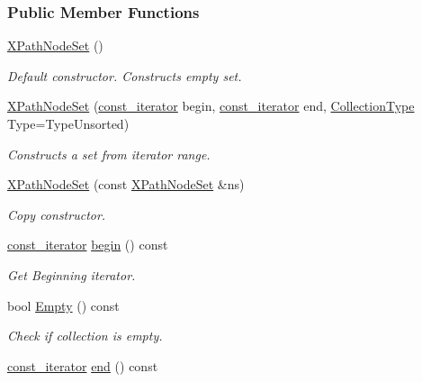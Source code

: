\subsubsection*{Public Member Functions}
\begin{DoxyCompactItemize}
\item 
\hypertarget{classMezzanine_1_1xml_1_1XPathNodeSet_ab608150b1aeff0937670c2f4b254e19d}{
\hyperlink{classMezzanine_1_1xml_1_1XPathNodeSet_ab608150b1aeff0937670c2f4b254e19d}{XPathNodeSet} ()}
\label{classMezzanine_1_1xml_1_1XPathNodeSet_ab608150b1aeff0937670c2f4b254e19d}

\begin{DoxyCompactList}\small\item\em Default constructor. Constructs empty set. \item\end{DoxyCompactList}\item 
\hyperlink{classMezzanine_1_1xml_1_1XPathNodeSet_a0346d486509ba8948918c623f6c697f5}{XPathNodeSet} (\hyperlink{classMezzanine_1_1xml_1_1XPathNode}{const\_\-iterator} begin, \hyperlink{classMezzanine_1_1xml_1_1XPathNode}{const\_\-iterator} end, \hyperlink{classMezzanine_1_1xml_1_1XPathNodeSet_aea2172f847690de3cd556c2d4ffca2a7}{CollectionType} Type=TypeUnsorted)
\begin{DoxyCompactList}\small\item\em Constructs a set from iterator range. \item\end{DoxyCompactList}\item 
\hyperlink{classMezzanine_1_1xml_1_1XPathNodeSet_a0a22bc65bcf93bc78a700fc4b300ee21}{XPathNodeSet} (const \hyperlink{classMezzanine_1_1xml_1_1XPathNodeSet}{XPathNodeSet} \&ns)
\begin{DoxyCompactList}\small\item\em Copy constructor. \item\end{DoxyCompactList}\item 
\hyperlink{classMezzanine_1_1xml_1_1XPathNode}{const\_\-iterator} \hyperlink{classMezzanine_1_1xml_1_1XPathNodeSet_a036caf8e18b320fc7d7c1737c13792df}{begin} () const 
\begin{DoxyCompactList}\small\item\em Get Beginning iterator. \item\end{DoxyCompactList}\item 
bool \hyperlink{classMezzanine_1_1xml_1_1XPathNodeSet_a4bd5465717e8cb2995bf21e7786e01c7}{Empty} () const 
\begin{DoxyCompactList}\small\item\em Check if collection is empty. \item\end{DoxyCompactList}\item 
\hypertarget{classMezzanine_1_1xml_1_1XPathNodeSet_af5a8c8ac690b24d828ea6b0af2105d6a}{
\hyperlink{classMezzanine_1_1xml_1_1XPathNode}{const\_\-iterator} \hyperlink{classMezzanine_1_1xml_1_1XPathNodeSet_af5a8c8ac690b24d828ea6b0af2105d6a}{end} () const }
\label{classMezzanine_1_1xml_1_1XPathNodeSet_af5a8c8ac690b24d828ea6b0af2105d6a}


\end{DoxyCompactItemize}

